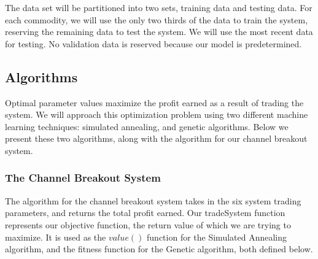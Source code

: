 \documentclass[10pt]{article}
\begin{document}
The data set will be partitioned into two sets, training data and testing data.
For each commodity, we will use the only two thirds of the data to train the
system, reserving the remaining data to test the system.  We will use the most
recent data for testing.  No validation data is reserved because our model is
predetermined.

\subsection{Algorithms}

Optimal parameter values maximize the profit earned as a result of trading the
system.  We will approach this optimization problem using two different machine
learning techniques: simulated annealing, and genetic algorithms.  Below we
present these two algorithms, along with the algorithm for our channel breakout
system.

\subsubsection{The Channel Breakout System}

The algorithm for the channel breakout system takes in the six system trading
parameters, and returns the total profit earned. Our tradeSystem function
represents our objective function, the return value of which we are trying to
maximize.  It is used as the $value()$ function for the Simulated Annealing algorithm,
and the fitness function for the Genetic algorithm, both defined below.
\end{document}
